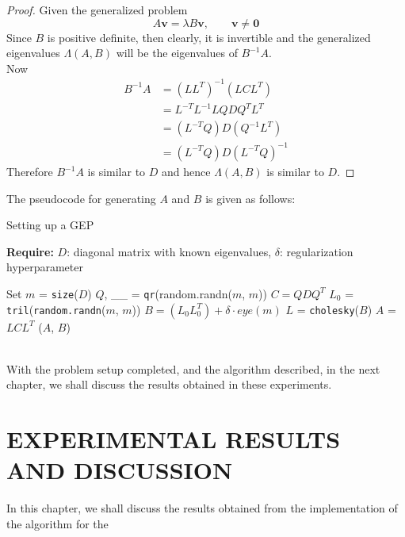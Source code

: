 \documentclass[12pt,gsu,online,openany,singleside,hidelinks]{gsudiss}
\newcommand{\comm}[1]{\added[comment={#1}]{}}
\begin{document}
\begin{proof}
	Given the generalized problem
	\begin{equation}
		A \mathbf{v} = \lambda B \mathbf{v}, \qquad \mathbf{v} \neq \mathbf{0}
	\end{equation}
	Since $B$ is positive definite, then clearly, it is invertible and the generalized eigenvalues $\Lambda(A, B)$ will be the eigenvalues of $B^{-1}A$.\\
	Now
	\begin{align*}
		B^{-1}A & = (LL^T)^{-1}(LCL^T)\\
		& = L^{-T}L^{-1}LQDQ^{T}L^T\\
		& = (L^{-T}Q)D(Q^{-1}L^{T}) \\
		& = (L^{-T}Q)D(L^{-T}Q)^{-1}
	\end{align*}
	Therefore $B^{-1}A$ is similar to $D$ and hence $\Lambda(A,B)$ is similar to $D$.
\end{proof}
The pseudocode for generating $A$ and $B$ is given as follows:\comm{The algorithm environment floats, so you can't know for sure it will end up after ``as follows.''  You should just put a reference like Algorithm \textbackslash ref\{alg:problem setup\}.  I don't know if that works with spaces in labels or not.  I usually use underscores.}
\begin{algorithm}
	\caption{Setting up a GEP}
	\label{alg:problem setup}
	
	\textbf{Require:} \( D \): diagonal matrix with known eigenvalues, \(\delta\): regularization hyperparameter
	\begin{algorithmic}[1]
		\State Set $m$ = \texttt{size}($D$)
		\State $Q$, \_\_ = \texttt{qr}(random.randn($m$, $m$))
		\State $C = QDQ^T$
		\State $L_{0}$ = \texttt{tril}(\texttt{random.randn}($m$, $m$))
		\State $B = (L_0 L_0^T) + \delta \cdot eye (m)$
		\State $L$ = \texttt{cholesky}($B$)
		\State $A$ = $LCL^T$
		\State \Return ($A$, $B$)
		\EndFunction
	\end{algorithmic}
\end{algorithm}\\

\comm{I would just write $B = (L_0 L_0^T) + \delta I$ in the pseudocode}
With the problem setup completed, and the algorithm described, in the next chapter, we shall discuss the results obtained in these experiments.
\comm{Overall, I like the pseudocode in this section.}

\chapter{EXPERIMENTAL RESULTS AND DISCUSSION}
In this chapter, we shall discuss the results obtained from the implementation of the algorithm for the 
\end{document}
